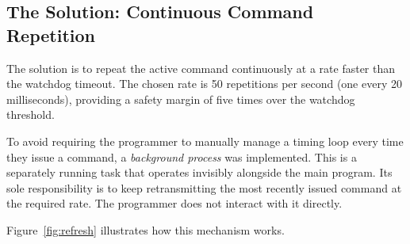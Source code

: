 \documentclass[12pt,a4paper]{article}
\begin{document}
\subsection{The Solution: Continuous Command Repetition}

The solution is to repeat the active command continuously at a rate faster
than the watchdog timeout. The chosen rate is 50 repetitions per second
(one every 20\,milliseconds), providing a safety margin of five times over
the watchdog threshold.

To avoid requiring the programmer to manually manage a timing loop every
time they issue a command, a \emph{background process} was implemented.
This is a separately running task that operates invisibly alongside the
main program. Its sole responsibility is to keep retransmitting the most
recently issued command at the required rate. The programmer does not
interact with it directly.

Figure~\ref{fig:refresh} illustrates how this mechanism works.
\end{document}
